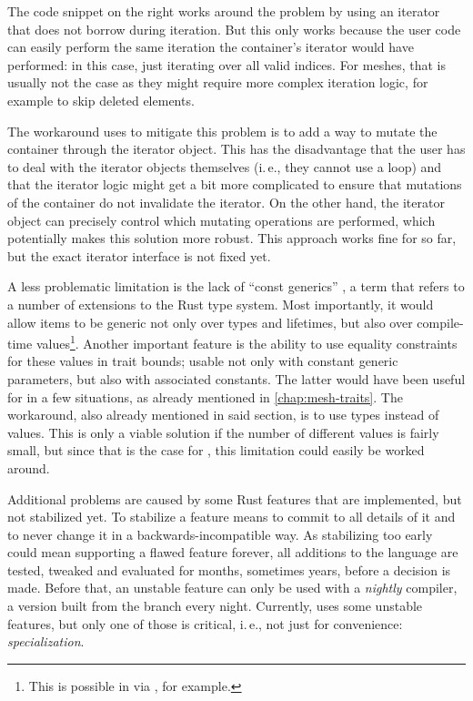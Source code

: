 The code snippet on the right works around the problem by using an iterator that does not borrow  during iteration.
But this only works because the user code can easily perform the same iteration the container's iterator would have performed: in this case, just iterating over all valid indices.
For meshes, that is usually not the case as they might require more complex iteration logic, for example to skip deleted elements.

The workaround  uses to mitigate this problem is to add a way to mutate the container through the iterator object.
This has the disadvantage that the user has to deal with the iterator objects themselves (i.\,e., they cannot use a  loop) and that the iterator logic might get a bit more complicated to ensure that mutations of the container do not invalidate the iterator.
On the other hand, the iterator object can precisely control which mutating operations are performed, which potentially makes this solution more robust.
This approach works fine for  so far, but the exact iterator interface is not fixed yet.

\newpage

A less problematic limitation is the lack of \enquote{const generics} \cite{rfc2000}, a term that refers to a number of extensions to the Rust type system.
Most importantly, it would allow items to be generic not only over types and lifetimes, but also over compile-time values\footnote{This is possible in \cpp via , for example.}.
Another important feature is the ability to use equality constraints for these values in trait bounds; usable not only with constant generic parameters, but also with associated constants.
The latter would have been useful for  in a few situations, as already mentioned in \autoref{chap:mesh-traits}.
The workaround, also already mentioned in said section, is to use types instead of values.
This is only a viable solution if the number of different values is fairly small, but since that is the case for , this limitation could easily be worked around.

\vfill

Additional problems are caused by some Rust features that are implemented, but not stabilized yet.
To stabilize a feature means to commit to all details of it and to never change it in a backwards-incompatible way.
As stabilizing too early could mean supporting a flawed feature forever, all additions to the language are tested, tweaked and evaluated for months, sometimes years, before a decision is made.
Before that, an unstable feature can only be used with a \emph{nightly} compiler, a version built from the  branch every night.
Currently,  uses some unstable features, but only one of those is critical, i.\,e., not just for convenience: \emph{specialization}.

